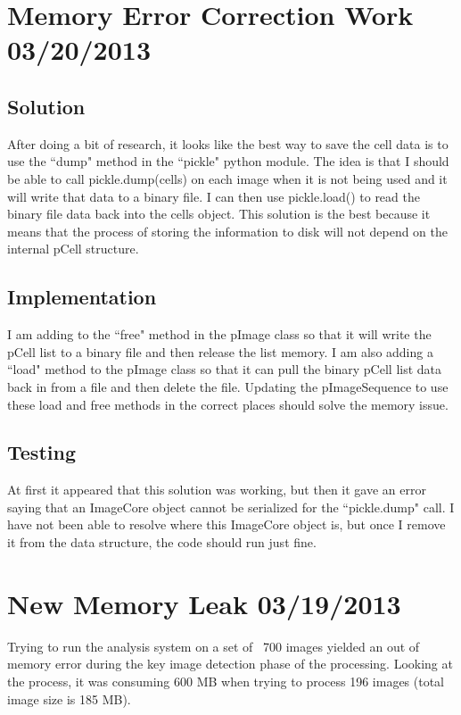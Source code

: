 \documentclass[]{article}
\begin{document}
	\tableofcontents
	\newpage
	\setcounter{page}{1}
	\thispagestyle{empty}
	
	
	\setlength{\parindent}{0pt}
	\setlength{\parskip}{6pt}
	
	\section{Memory Error Correction Work 03/20/2013}
		\subsection{Solution}
			After doing a bit of research, it looks like the best way to save the cell data is to use the ``dump" method in the ``pickle" python module. The idea is that I should be able to call pickle.dump(cells) on each image when it is not being used and it will write that data to a binary file. I can then use pickle.load() to read the binary file data back into the cells object. This solution is the best because it means that the process of storing the information to disk will not depend on the internal pCell structure. 
			
		\subsection{Implementation}
			I am adding to the ``free" method in the pImage class so that it will write the pCell list to a binary file and then release the list memory. I am also adding a ``load" method to the pImage class so that it can pull the binary pCell list data back in from a file and then delete the file. Updating the pImageSequence to use these load and free methods in the correct places should solve the memory issue.
			
		\subsection{Testing}
			At first it appeared that this solution was working, but then it gave an error saying that an ImageCore object cannot be serialized for the ``pickle.dump" call. I have not been able to resolve where this ImageCore object is, but once I remove it from the data structure, the code should run just fine. 
	
	\section{New Memory Leak 03/19/2013}
		Trying to run the analysis system on a set of ~700 images yielded an out of memory error during the key image detection phase of the processing. Looking at the process, it was consuming 600 MB when trying to process 196 images (total image size is 185 MB). 
		
\end{document}
